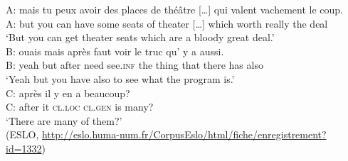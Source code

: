 \documentclass[output=paper,colorlinks,citecolor=brown]{langscibook}
\begin{document}
\ea
\label{theatre:Jayez}
\gll A: mais tu peux avoir des places de théâtre [\dots] qui valent vachement le coup.\\
{A:} but you can have some seats of theater [\dots] which worth really the deal\\
\glt `But you can get theater seats which are a bloody great deal.'\\
\gll B: ouais mais après faut voir le truc qu' y a aussi.\\
{B:} yeah but after need see.\textsc{inf} the thing that there has also\\
\glt `Yeah but you have also to see what the program is.'\\
\gll C: après il y en a beaucoup?\\
     {C:} after it \textsc{cl.loc} \textsc{cl.gen} is many?\\
\glt `There are many of them?'\\
(ESLO, \url{http://eslo.huma-num.fr/CorpusEslo/html/fiche/enregistrement?id=1332})
\z
\end{document}
